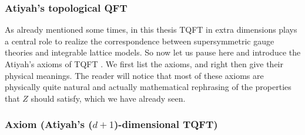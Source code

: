 \subsubsection{Atiyah's topological QFT}
\label{sec:Atiyah_TQFT}

As already mentioned some times, in this thesis TQFT in extra dimensions
plays a central role to realize the correspondence between supersymmetric
gauge theories and integrable lattice models. So now let us pause
here and introduce the Atiyah's axioms of TQFT \cite{Atiyah:1989vu}. We first list the
axioms, and right then give their physical meanings. The reader will
notice that most of these axioms are physically quite natural and
actually mathematical rephrasing of the properties that $Z$ should
satisfy, which we have already seen.




\subsubsection*{Axiom (Atiyah's ($d+1$)-dimensional TQFT)}

